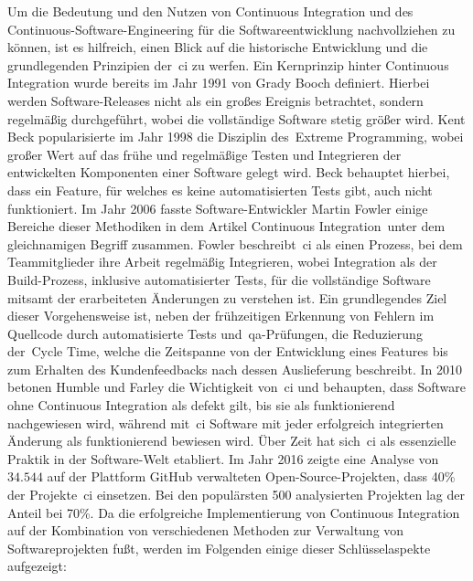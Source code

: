 Um die Bedeutung und den Nutzen von Continuous Integration und des Continuous-Software-Engineering für die
Softwareentwicklung nachvollziehen zu können, ist es hilfreich, einen Blick auf die historische Entwicklung und die
grundlegenden Prinzipien der\ \acrshort{ci} zu werfen.
Ein Kernprinzip hinter Continuous Integration wurde bereits im Jahr 1991 von Grady Booch definiert.
Hierbei werden Software-Releases nicht als ein großes Ereignis betrachtet, sondern regelmäßig durchgeführt, wobei
die vollständige Software stetig größer wird.
Kent Beck popularisierte im Jahr 1998 die Disziplin des\ \glqq Extreme Programming\grqq, wobei großer Wert auf das frühe
und regelmäßige Testen und Integrieren der entwickelten Komponenten einer Software gelegt wird.
Beck behauptet hierbei, dass ein Feature, für welches es keine automatisierten Tests gibt, auch nicht funktioniert.
Im Jahr 2006 fasste Software-Entwickler Martin Fowler einige Bereiche dieser Methodiken in dem Artikel
\glqq Continuous Integration\grqq\ unter dem gleichnamigen Begriff zusammen.
Fowler beschreibt\ \acrshort{ci} als einen Prozess, bei dem Teammitglieder ihre Arbeit regelmäßig Integrieren,
wobei Integration als der Build-Prozess, inklusive automatisierter Tests, für die vollständige Software mitsamt der
erarbeiteten Änderungen zu verstehen ist.
Ein grundlegendes Ziel dieser Vorgehensweise ist, neben der frühzeitigen Erkennung von Fehlern im Quellcode durch
automatisierte Tests und\ \acrshort{qa}-Prüfungen, die Reduzierung der\ \glqq Cycle Time\grqq, welche die Zeitspanne von
der Entwicklung eines Features bis zum Erhalten des Kundenfeedbacks nach dessen Auslieferung beschreibt.
In 2010 betonen Humble und Farley die Wichtigkeit von\ \acrshort{ci} und behaupten, dass Software ohne Continuous
Integration als defekt gilt, bis sie als funktionierend nachgewiesen wird, während mit\ \acrshort{ci} Software mit
jeder erfolgreich integrierten Änderung als funktionierend bewiesen wird.
Über Zeit hat sich\ \acrshort{ci} als essenzielle Praktik in der Software-Welt etabliert.
Im Jahr 2016 zeigte eine Analyse von $34.544$ auf der Plattform GitHub verwalteten Open-Source-Projekten, dass 40\% der
Projekte\ \acrshort{ci} einsetzen.
Bei den populärsten 500 analysierten Projekten lag der Anteil bei 70\%.
Da die erfolgreiche Implementierung von Continuous Integration auf der Kombination von verschiedenen Methoden zur
Verwaltung von Softwareprojekten fußt, werden im Folgenden einige dieser Schlüsselaspekte aufgezeigt:

